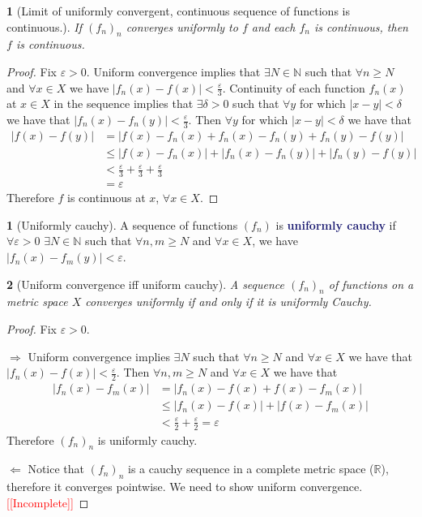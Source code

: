 \documentclass[11pt]{article}
\numberwithin{equation}{section}
\newcommand{\navy}[1]{\textcolor{MidnightBlue}{\bf #1}}
\theoremstyle{plain}
\newtheorem{theorem}{\color{ForestGreen}{\textbf{Theorem}}}[section]
\theoremstyle{definition}
\newtheorem{definition}{\color{MidnightBlue}{\textbf{Definition}}}[section]
\def\imp{\Rightarrow}
\def\pmi{\Leftarrow}
\newcommand{\1}{\mathbbm 1}
\def\d{\delta}
\newcommand{\e}{\varepsilon}
\newcommand{\RR}{\mathbb R}
\newcommand{\NN}{\mathbb N}
\begin{document}
\begin{theorem}[Limit of uniformly convergent, continuous sequence of functions is continuous.]
	If $(f_n)_n$ converges uniformly to $f$ and each $f_n$ is continuous, then $f$ is continuous.
\end{theorem}
\begin{proof}
	Fix $\e > 0$. Uniform convergence implies that $\exists N \in \NN$ such that $\forall n \geq N$ and $\forall x \in X$ we have $|f_n(x) - f(x)| < \frac{\e}{3}$. Continuity of each function $f_n(x)$ at $x \in X$ in the sequence implies that $\exists \d > 0$ such that $\forall y$ for which $|x - y| < \d$ we have that $|f_n(x) - f_n(y)| < \frac{\e}{3}$. Then $\forall y$ for which $|x - y| < \d$ we have that
	\begin{align*}
		|f(x) - f(y)| &= |f(x)- f_n(x) + f_n(x) - f_n(y) + f_n(y) - f(y)| \\
		&\leq |f(x)- f_n(x)| + |f_n(x) - f_n(y)| + |f_n(y) - f(y)| \tag{$\Delta$} \\
		&< \frac{\e}{3} + \frac{\e}{3} + \frac{\e}{3} \tag{uniform convergence and continuity of $f_n$ at $x$} \\
		&= \e
	\end{align*}
	Therefore $f$ is continuous at $x$, $\forall x \in X$.   
\end{proof}

\begin{definition}[Uniformly cauchy]
	A sequence of functions $(f_n)$ is \navy{uniformly cauchy} if $\forall \e > 0$ $\exists N \in \NN$ such that $\forall n,m \geq N$ and $\forall x \in X$, we have $|f_n(x) - f_m(y)| < \e$. 
\end{definition}


\begin{theorem}[Uniform convergence iff uniform cauchy]
	A sequence $(f_n)_n$ of functions on a metric space $X$ converges uniformly if and only if it is uniformly Cauchy.
\end{theorem}
\begin{proof} Fix $\e > 0$.

	$\imp$ Uniform convergence implies $\exists N$ such that $\forall n \geq N$ and $\forall x \in X$ we have that $|f_n(x)-f(x)|<\frac{\e}{2}$. Then $\forall n,m \geq N$ and $\forall x \in X$ we have that
	\begin{align*}
		|f_n(x) - f_m(x)| &= |f_n(x) - f(x) + f(x) - f_m(x)| \\
		&\leq |f_n(x) - f(x)| + |f(x) - f_m(x)| \\
		&< \frac{\e}{2} + \frac{\e}{2} = \e
	\end{align*}
	Therefore $(f_n)_n$ is uniformly cauchy. 

	$\pmi$ Notice that $(f_n)_n$ is a cauchy sequence in a complete metric space ($\RR$), therefore it converges pointwise. We need to show uniform convergence. \textcolor{red}{[[Incomplete]]}
\end{proof}
\end{document}
